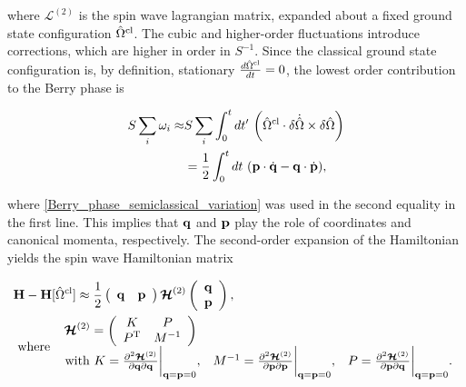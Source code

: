 where $ \bm{\mathcal{L}}^{(2)}$ is the spin wave lagrangian matrix, expanded about a fixed ground state configuration $\hat{\Omega}^{\textnormal{cl}}$. The cubic and higher-order fluctuations introduce corrections, which are higher in order in $S^{-1}$. Since the classical ground state configuration is, by definition, stationary $\frac{d \hat{\Omega}^{\textnormal{cl}}}{dt} = 0$, the lowest order contribution to the Berry phase is 

\begin{equation}
\begin{split}
    S \sum_{i}\omega_i \approx& S \sum_{i} \int_{0}^{t} dt' \textnormal{ } \bigg(\hat{\Omega}^{\textnormal{cl}} \cdot \delta\dot{\hat{\Omega}} \times \delta \hat{\Omega} \bigg) \\
    &= \frac{1}{2} \int_{0}^{t} dt \textnormal{ } ({\bf p} \cdot \dot{{\bf q}} - {\bf q} \cdot \dot{{\bf p}}),
\end{split}
\end{equation}

where \cref{Berry_phase_semiclassical_variation} was used in the second equality in the first line. This implies that ${\bf q}$ and ${\bf p}$ play the role of coordinates and canonical momenta, respectively. The second-order expansion of the Hamiltonian yields the spin wave Hamiltonian matrix 

\begin{equation}
    \begin{split}
        &{\bf H} - {\bf H}[\hat{\Omega}^{\textnormal{cl}}] \approx \frac{1}{2} \left(\begin{array}{cc}
          {\bf q} & {\bf p}
    \end{array}\right) \bm{\mathcal{H}}^{(2)} \left( \begin{array}{c}
          {\bf q} \\
          {\bf p}
    \end{array}\right), \\
    &\textnormal{ where } \begin{array}{ccc}
         \bm{\mathcal{H}}^{(2)} = \left(\begin{array}{cc}
         K & P  \\
         P^{\textnormal{T}} & M^{-1} 
    \end{array}\right) \\
         \textnormal{ with } K = \frac{\partial^2 \bm{\mathcal{H}}^{(2)}}{\partial {\bf q} \partial {\bf q}}\bigg|_{{\bf q} = {\bf p} = 0}, & 
         M^{-1} = \frac{\partial^2 \bm{\mathcal{H}}^{(2)}}{\partial {\bf p} \partial {\bf p}}\bigg|_{{\bf q} = {\bf p} = 0}, & 
         P = \frac{\partial^2 \bm{\mathcal{H}}^{(2)}}{\partial {\bf p} \partial {\bf q}}\bigg|_{{\bf q} = {\bf p} = 0}.
    \end{array}
    \end{split}
    \label{spin_wave_path_integral_quadratic_form_matrix_form}
\end{equation}

